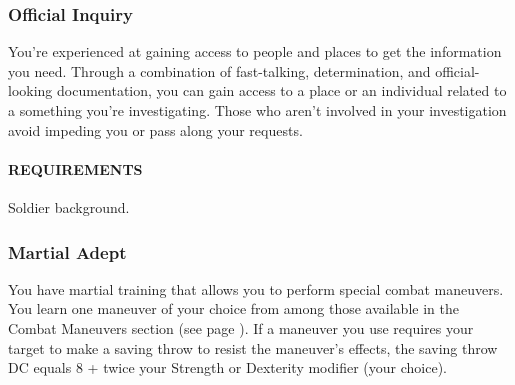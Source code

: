 
    \subsubsection{Official Inquiry} \label{feat::officialinquiry}
        You're experienced at gaining access to people and places to get the information you need.
        Through a combination of fast-talking, determination, and official-looking documentation, you can gain access to a place or an individual related to a something you're investigating.
        Those who aren't involved in your investigation avoid impeding you or pass along your requests.
        \paragraph{REQUIREMENTS} Soldier background.

    \subsubsection{Martial Adept} \label{feat::martialadept}
        You have martial training that allows you to perform special combat maneuvers.
        You learn one maneuver of your choice from among those available in the Combat Maneuvers section (see page \pageref{ssec::combatmaneuvers}).
        If a maneuver you use requires your target to make a saving throw to resist the maneuver's effects, the saving throw DC equals 8 + twice your Strength or Dexterity modifier (your choice).


